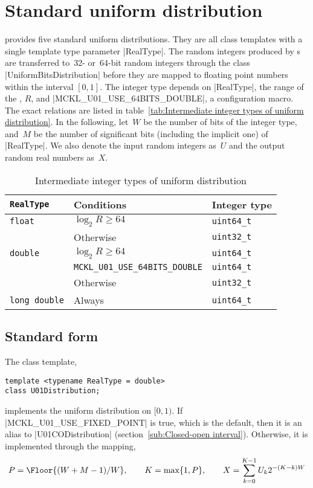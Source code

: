 \section{Standard uniform distribution}
\label{sec:Standard uniform distribution}

\mckl provides five standard uniform distributions. They are all class
templates with a single template type parameter |RealType|. The random integers
produced by \rng{}s are transferred to~32- or~64-bit random integers through
the class |UniformBitsDistribution| before they are mapped to floating point
numbers within the interval $[0, 1]$. The integer type depends on |RealType|,
the range of the \rng{}, $R$, and |MCKL_U01_USE_64BITS_DOUBLE|, a configuration
macro. The exact relations are listed in table~\ref{tab:Intermediate integer
types of uniform distribution}. In the following, let~$W$ be the number of bits
of the integer type, and~$M$ be the number of significant bits (including the
implicit one) of |RealType|. We also denote the input random integers as~$U$
and the output random real numbers as~$X$.

\begin{table}
  \begin{tabularx}{\textwidth}{LlL}
    \toprule
    \texttt{RealType} & Conditions & Integer type \\
    \midrule
    \texttt{float}  & $\log_2 R \ge 64$ & \texttt{uint64\_t} \\
                    & Otherwise         & \texttt{uint32\_t} \\
    \texttt{double} & $\log_2 R \ge 64$ & \texttt{uint64\_t} \\
    & \texttt{MCKL\_U01\_USE\_64BITS\_DOUBLE} & \texttt{uint64\_t} \\
    & Otherwise & \texttt{uint32\_t} \\
    \texttt{long double} & Always & \texttt{uint64\_t} \\
    \bottomrule
  \end{tabularx}
  \caption{Intermediate integer types of uniform distribution}
  \label{tab:Intermediate integer types of uniform distribution}
\end{table}

\subsection{Standard form}
\label{sub:Standard form}

The class template,
\begin{verbatim}
template <typename RealType = double>
class U01Distribution;
\end{verbatim}
implements the uniform distribution on $[0, 1)$. If |MCKL_U01_USE_FIXED_POINT|
  is true, which is the default, then it is an alias to |U01CODistribution|
  (section~\ref{sub:Closed-open interval}). Otherwise, it is implemented
  through the mapping,
\begin{equation*}
  P = \Floor{(W + M - 1) / W},\qquad
  K = \max\{1, P\},\qquad
  X = \sum_{k=0}^{K - 1} U_k 2^{-(K - k)W}
\end{equation*}

